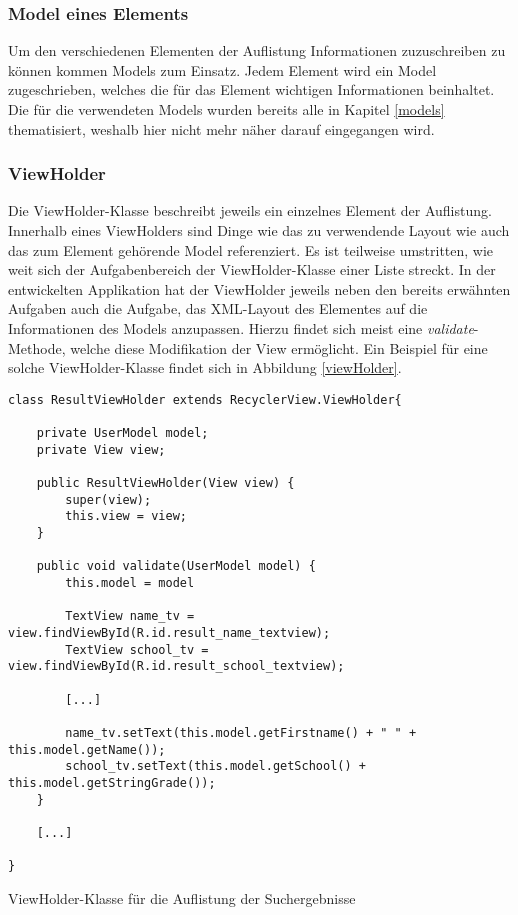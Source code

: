 \documentclass[../main.tex]{subfiles}
\begin{document}
	\subsubsection{Model eines Elements}
	Um den verschiedenen Elementen der Auflistung Informationen zuzuschreiben zu können kommen Models zum Einsatz. Jedem Element wird ein Model zugeschrieben, welches die für das Element wichtigen Informationen beinhaltet. Die für die verwendeten Models wurden bereits alle in Kapitel \ref{models} thematisiert, weshalb hier nicht mehr näher darauf eingegangen wird.
	
	\subsubsection{ViewHolder}
	Die ViewHolder-Klasse beschreibt jeweils ein einzelnes Element der Auflistung. Innerhalb eines ViewHolders sind Dinge wie das zu verwendende Layout wie auch das zum Element gehörende Model referenziert. Es ist teilweise umstritten, wie weit sich der Aufgabenbereich der ViewHolder-Klasse einer Liste streckt. In der entwickelten Applikation hat der ViewHolder jeweils neben den bereits erwähnten Aufgaben auch die Aufgabe, das XML-Layout des Elementes auf die Informationen des Models anzupassen. Hierzu findet sich meist eine \emph{validate}-Methode, welche diese Modifikation der View ermöglicht. Ein Beispiel für eine solche ViewHolder-Klasse findet sich in Abbildung \ref{viewHolder}.

\begin{code}
	\begin{center}
		\begin{verbatim}
class ResultViewHolder extends RecyclerView.ViewHolder{
	
	private UserModel model;
	private View view;
	
	public ResultViewHolder(View view) {
		super(view);
		this.view = view;
	}
	
	public void validate(UserModel model) {
		this.model = model
	
		TextView name_tv = view.findViewById(R.id.result_name_textview);
		TextView school_tv = view.findViewById(R.id.result_school_textview);
		
		[...]
		
		name_tv.setText(this.model.getFirstname() + " " + this.model.getName());
		school_tv.setText(this.model.getSchool() + this.model.getStringGrade());
	}
	
	[...]
	
}
		\end{verbatim}
		\caption{ViewHolder-Klasse für die Auflistung der Suchergebnisse}
		\label{viewHolder}
	\end{center}
\end{code}
\end{document}

